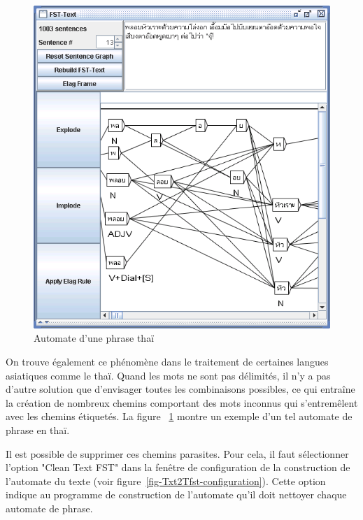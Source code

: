 \begin{figure}[!ht]
\begin{center}
\includegraphics[width=14cm]{resources/img/fig7-9.png}
\caption{Automate d’une phrase thaï\label{fig-thai-sentence-automaton}}
\end{center}
\end{figure}

\bigskip
\noindent On trouve également ce phénomène dans le traitement de certaines langues asiatiques
comme le thaï. Quand les mots ne sont pas délimités, il n’y a pas d’autre solution que d’envisager
toutes les combinaisons possibles, ce qui entraîne la création de nombreux chemins
comportant des mots inconnus qui s’entremêlent avec les chemins étiquetés. La figure
~\ref{fig-thai-sentence-automaton} montre un exemple d’un tel automate de phrase en thaï.

\bigskip
\noindent Il est possible de supprimer ces chemins parasites. Pour cela, il faut sélectionner l’option
"Clean Text FST" dans la fenêtre de configuration de la construction de l’automate du texte
(voir figure~\ref{fig-Txt2Tfst-configuration}). Cette option indique au programme de construction de
l’automate qu’il doit nettoyer chaque automate de phrase.


